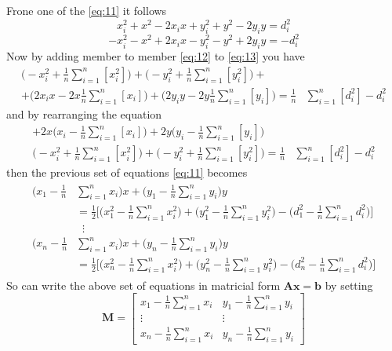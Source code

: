 \documentclass[12pt,twoside]{report}
\begin{document}
Frone one of the \ref{eq:11} it follows
\begin{equation}
x_i^2+x^2-2x_ix+y_i^2+y^2-2y_iy=d_i^2      
\end{equation}
\begin{equation}
-x_i^2-x^2+2x_ix-y_i^2-y^2+2y_iy=-d_i^2
\label{eq:13}
\end{equation}
Now by adding member to member \ref{eq:12} to \ref{eq:13} you have 
\begin{equation}
\begin{split}
    \bigg(-x_i^2  + \frac{1}{n}\sum_{i=1}^n[x_i^2]\bigg)+
    \bigg(-y_i^2+ \frac{1}{n}\sum_{i=1}^n[y_i^2]\bigg)+\\
    +\bigg(2x_ix-2x\frac{1}{n}\sum_{i=1}^n[x_i]\bigg)+
    \bigg(2y_iy -2y\frac{1}{n}\sum_{i=1}^n[y_i]\bigg)
    =\frac{1}{n}&\sum_{i=1}^n[d_i^2]-d_i^2
\end{split}    
\end{equation}
and by rearranging the equation
\begin{equation}
\begin{split}
    +2x\bigg(x_i-\frac{1}{n}\sum_{i=1}^n[x_i]\bigg)+
    2y\bigg(y_i -\frac{1}{n}\sum_{i=1}^n[y_i]\bigg)\\
    \bigg(-x_i^2  + \frac{1}{n}\sum_{i=1}^n[x_i^2]\bigg)+
    \bigg(-y_i^2+ \frac{1}{n}\sum_{i=1}^n[y_i^2]\bigg)
    =\frac{1}{n}&\sum_{i=1}^n[d_i^2]-d_i^2
\end{split}    
\end{equation}
then the previous set of equations \ref{eq:11} becomes
\begin{align}
\begin{split} 
    \bigg(x_1-\frac{1}{n}&\sum_{i=1}^nx_i\bigg)x+\bigg(y_1-\frac{1}{n}\sum_{i=1}^ny_i\bigg)y\\
    &=\frac{1}{2}\bigg[\bigg(x_1^2-\frac{1}{n}\sum_{i=1}^nx^2_i\bigg)+\bigg(y_1^2-\frac{1}{n}\sum_{i=1}^ny^2_i\bigg)-\bigg(d_1^2-\frac{1}{n}\sum_{i=1}^nd_i^2\bigg)\bigg]\\
&\;\;\vdots\\
    \bigg(x_n-\frac{1}{n}&\sum_{i=1}^nx_i\bigg)x+\bigg(y_n-\frac{1}{n}\sum_{i=1}^ny_i\bigg)y\\
    &=\frac{1}{2}\bigg[\bigg(x_n^2-\frac{1}{n}\sum_{i=1}^nx^2_i\bigg)+\bigg(y_n^2-\frac{1}{n}\sum_{i=1}^ny^2_i\bigg)-\bigg(d_n^2-\frac{1}{n}\sum_{i=1}^nd_i^2\bigg)\bigg]
\end{split}
\end{align}
So can write the above set of equations in matricial form $\mathbf{Ax}=\mathbf{b}$ by setting
$$
\mathbf{M}=\begin{bmatrix}
    x_1-\frac{1}{n}\sum_{i=1}^nx_i&y_1-\frac{1}{n}\sum_{i=1}^ny_i\\
    \vdots&\vdots\\
    x_n-\frac{1}{n}\sum_{i=1}^nx_i&y_n-\frac{1}{n}\sum_{i=1}^ny_i
\end{bmatrix}
$$
\end{document}

